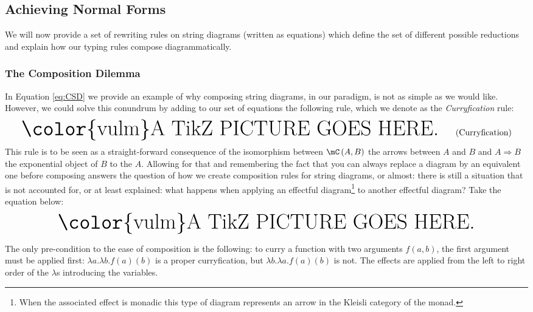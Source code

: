 \documentclass[math, english, info]{cours}
\makeatletter
\def\tikzimp@rt{0}
\def\inputtikz#1{
	\ifnum\tikzimp@rt=1
		
	\else
		\ensuremath{\text{\Huge\color{vulm}A TikZ PICTURE GOES HERE.}}
	\fi
}
\makeatother
\begin{document}
\subsection{Achieving Normal Forms}
\label{subsec:normalforms}
We will now provide a set of rewriting rules on string diagrams (written as equations) which define the set of different possible reductions and explain how our typing rules compose diagrammatically.

\subsubsection{The Composition Dilemma}
In Equation \eqref{eq:CSD} we provide an example of why composing string diagrams, in our paradigm, is not as simple as we would like.
However, we could solve this conundrum by adding to our set of equations the following rule, which we denote as the \emph{Curryfication} rule:
\begin{equation}
	\inputtikz{sd-curry}
		\label{eq:curry}\tag{Curryfication}
\end{equation}
This rule is to be seen as a straight-forward consequence of the isomorphism between $\mC\left( A, B\right)$ the arrows between $A$ and $B$ and $A \Rightarrow B$ the exponential object of $B$ to the $A$.
Allowing for that and remembering the fact that you can always replace a diagram by an equivalent one before composing answers the question of how we create composition rules for string diagrams, or almost: there is still a situation that is not accounted for, or at least explained: what happens when applying an effectful diagram\footnote{When the associated effect is monadic this type of diagram represents an arrow in the Kleisli category of the monad.}  to another effectful diagram?
Take the equation below:
\begin{equation*}
	\inputtikz{sd-kleisli-composition}
\end{equation*}

The only pre-condition to the ease of composition is the following: to curry a function with two arguments $f\left( a, b \right)$, the first argument must be applied first: $\lambda a. \lambda b. f(a)(b)$ is a proper curryfication, but $\lambda b. \lambda a. f(a)(b)$ is not.
The effects are applied from the left to right order of the $\lambda$s introducing the variables.
\end{document}
